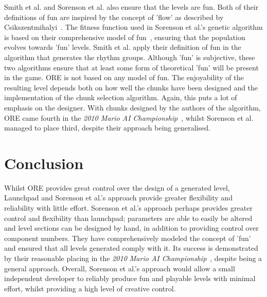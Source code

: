\documentclass{scrartcl}
\begin{document}
Smith et al. and Sorenson et al. also ensure that the levels are fun. Both of their definitions of fun are inspired by the concept of 'flow' as described by Csikszentmihalyi~\cite{csik:flow, smith:rhythm}. The fitness function used in Sorenson et al.'s genetic algorithm is based on their comprehensive model of fun~\cite{sorenson:fun}, ensuring that the population evolves towards 'fun' levels. Smith et al. apply their definition of fun in the algorithm that generates the rhythm groups. Although 'fun' is subjective, these two algorithms ensure that at least some form of theoretical 'fun' will be present in the game.
ORE is not based on any model of fun. The enjoyability of the resulting level depends both on how well the chunks have been designed and the implementation of the chunk selection algorithm. Again, this puts a lot of emphasis on the designer. With chunks designed by the authors of the algorithm, ORE came fourth in the \textit{2010 Mario AI Championship}~\cite{shaker:mario}, whilst Sorenson et al. managed to place third, despite their approach being generalised.


\section{Conclusion}
Whilst ORE provides great control over the design of a generated level, Launchpad and Sorenson et al.'s approach provide greater flexibility and reliability with little effort. Sorenson et al.'s approach perhaps provides greater control and flexibility than launchpad; parameters are able to easily be altered and level sections can be designed by hand, in addition to providing control over component numbers. They have comprehensively modeled the concept of 'fun' and ensured that all levels generated comply with it. Its success is demonstrated by their reasonable placing in the \textit{2010 Mario AI Championship}~\cite{shaker:mario}, despite being a general approach. Overall, Sorenson et al.'s approach would allow a small independent developer to reliably produce fun and playable levels with minimal effort, whilst providing a high level of creative control.




\end{document}
